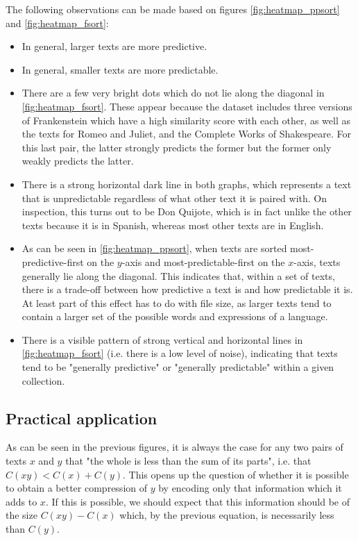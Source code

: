 The following observations can be made based on figures \ref{fig:heatmap_ppsort} and \ref{fig:heatmap_fsort}:
\begin{itemize}
  \item In general, larger texts are more predictive.
  \item In general, smaller texts are more predictable.
  \item There are a few very bright dots which do not lie along the diagonal in \ref{fig:heatmap_fsort}. These appear because the dataset includes three versions of Frankenstein which have a high similarity score with each other, as well as the texts for Romeo and Juliet, and the Complete Works of Shakespeare. For this last pair, the latter strongly predicts the former but the former only weakly predicts the latter.
  \item There is a strong horizontal dark line in both graphs, which represents a text that is unpredictable regardless of what other text it is paired with. On inspection, this turns out to be Don Quijote, which is in fact unlike the other texts because it is in Spanish, whereas most other texts are in English.
  \item As can be seen in \ref{fig:heatmap_ppsort}, when texts are sorted most-predictive-first on the $y$-axis and most-predictable-first on the $x$-axis, texts generally lie along the diagonal. This indicates that, within a set of texts, there is a trade-off between how predictive a text is and how predictable it is. At least part of this effect has to do with file size, as larger texts tend to contain a larger set of the possible words and expressions of a language.
  \item There is a visible pattern of strong vertical and horizontal lines in \ref{fig:heatmap_fsort} (i.e. there is a low level of noise), indicating that texts tend to be "generally predictive" or "generally predictable" within a given collection.
\end{itemize}

\subsection{Practical application}
\label{subsec:co_comp_practical}

As can be seen in the previous figures, it is always the case for any two pairs of texts $x$ and $y$ that "the whole is less than the sum of its parts", i.e. that $C(xy) < C(x) + C(y)$. This opens up the question of whether it is possible to obtain a better compression of $y$ by encoding only that information which it adds to $x$. If this is possible, we should expect that this information should be of the size $C(xy) - C(x)$ which, by the previous equation, is necessarily less than $C(y)$.

